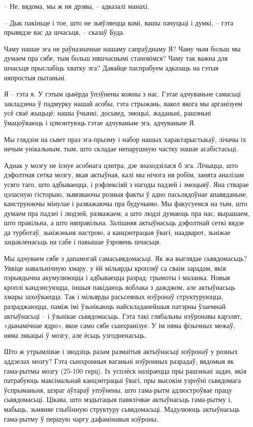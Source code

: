 – Не, вядома, мы ж ня дрэвы, – адказалі манахі.

– Дык пакіньце і тое, што не зьяўляецца вамі, вашы пачуцьці і думкі, -- гэта прывядзе вас да шчасьця, – сказаў Буда.

Чаму нашае эга не раўназначнае нашаму сапраўднаму Я? Чаму чым больш мы думаем пра сябе, тым больш няшчаснымі становімся? Чаму так важна для шчасьця прыслабіць хватку эга? Давайце паспрабуем адказаць на гэтыя няпростыя пытаньні.

Я – гэта я. У гэтым цьвёрда ўпэўнены кожны з нас. Гэтае адчуваньне самасьці закладзена ў падмурку нашай асобы, гэта стрыжань, вакол якога мы арганізуем усё сваё жыцьцё: нашы ўчынкі, досьвед, эмоцыі, жаданьні, рашэньні ўмацоўваюць і цэмэнтуюць гэтае адчуваньне эга, адчуваньне Я.

Мы глядзім на сьвет праз эга-прызму і набор нашых характарыстыкаў, лічачы іх нечым унікальным, тым, што складае непарушную частку нашае асабістасьці.

Аднак у мозгу не існуе асобнага цэнтра, дзе знаходзілася б эга. Лічыцца, што дэфолтная сетка мозгу, якая актыўная, калі мы нічога ня робім, занята аналізам усяго таго, што адбываецца, і рэфлексіяй з нагоды падзей і эмоцыяў. Яна стварае цэласную гісторыю, зьвязваючы розныя факты ў адно пасьлядоўнае апавяданьне, канструюючы мінулае і разважаючы пра будучыню. Мы факусуемся на тым, што думаем пра падзеі і людзей, разважаем, а што людзі думаюць пра нас, вырашаем, што правільна, а што няправільна. Залішняя актыўнасьць дэфолтнай сеткі вядзе да турботаў, зьніжэньня настрою, а канцэнтрацыя ўвагі, наадварот, зьніжае зацыкленасьць на сабе і павышае ўзровень шчасьця.

Мы адчуваем сябе з дапамогай самасьвядомасьці. Як жа выглядае сьвядомасьць? Уявіце навальнічную хмару, у ёй мільярды кропляў са сваім зарадам, якія пэрыядычна акумулююцца і адбываецца разрад: грымоты і маланка. Новыя кроплі кандэнсуюцца, іншыя пакідаюць воблака з дажджом, але актыўнасьць хмары захоўваецца. Так і мільярды расьсеяных нэўронаў структуруюцца, разраджаюцца, паміж імі ўзьнікаюць найскладанейшыя патэрны ўзаемнай актыўнасьці – і ўзьнікае сьвядомасьць. Гэта такі глябальны нэўронавы карэлят, «дынамічнае ядро», якое само сябе сынхранізуе. У ім няма фізычных межаў, няма лякацыі ў мозгу, але ёсьць узгодненасьць.

Што ж утрымлівае і зводзіць разам размаітыя актыўнасьці нэўронаў у розных аддзелах мозгу? Гэта сынхронныя ваганьні нэўронных разрадаў, вядомыя як гама-рытмы мозгу (25-100 герц). Іх усплёск назіраецца пры рашэньні задач, якія патрабуюць максімальнай канцэнтрацыі ўвагі, пры высокім узроўні сьвядомага ўспрыманьня, шэраг аўтараў упэўнены, што гама-рытм адлюстроўвае працу сьвядомасьці. Цікава, што мэдытацыя павялічвае актыўнасьць гама-рытму і, мабыць, зьмяняе глыбінную структуру сьвядомасьці. Мадулююць актыўнасьць гама-рытму ў першую чаргу дафамінавыя нэўроны.

